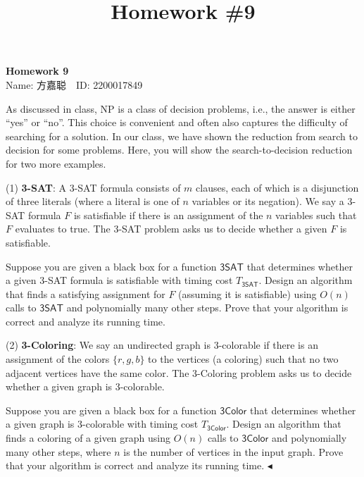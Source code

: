 \documentclass[11pt]{article}
\title{Homework \#9}
\newenvironment{problem}[2][Problem]{\begin{trivlist}
    \item[\hskip \labelsep{\bfseries#1}\hskip\labelsep{\bfseries#2.}]\mbox{}\newline}{\hfill$\blacktriangleleft$\end{trivlist}}
\begin{document}
\kaishu

\pagestyle{fancy}
\chead{}

\begin{center}
    {\LARGE \bf Homework 9}\\
    {Name: 方嘉聪\ \  ID: 2200017849}            %
\end{center}

\begin{problem}{1.(Search and Decision Problems)}
    As discussed in class, NP is a class of decision problems, i.e., the answer is either ``yes'' or ``no''. This choice is convenient and often also captures the difficulty of searching for a solution. In our class, we have shown the reduction from search to decision for some problems. Here, you will show the search-to-decision reduction for two more examples.

    (1) \textbf{3-SAT}: A 3-SAT formula consists of $m$ clauses, each of which is a disjunction of three literals (where a literal is one of $n$ variables or its negation). We say a 3-SAT formula $F$ is satisfiable if there is an assignment of the $n$ variables such that $F$ evaluates to true. The 3-SAT problem asks us to decide whether a given $F$ is satisfiable.
    
    Suppose you are given a black box for a function $\mathsf{3SAT}$ that determines whether a given 3-SAT formula is satisfiable with timing cost $T_{\mathsf{3SAT}}$. Design an algorithm that finds a satisfying assignment for $F$ (assuming it is satisfiable) using $O(n)$ calls to $\mathsf{3SAT}$ and polynomially many other steps. Prove that your algorithm is correct and analyze its running time.
    
    (2) \textbf{3-Coloring}: We say an undirected graph is 3-colorable if there is an assignment of the colors $\{r, g, b\}$ to the vertices (a coloring) such that no two adjacent vertices have the same color. The 3-Coloring problem asks us to decide whether a given graph is 3-colorable.
    
    Suppose you are given a black box for a function $\mathsf{3Color}$ that determines whether a given graph is 3-colorable with timing cost $T_{\mathsf{3Color}}$. Design an algorithm that finds a coloring of a given graph using $O(n)$ calls to $\mathsf{3Color}$ and polynomially many other steps, where $n$ is the number of vertices in the input graph. Prove that your algorithm is correct and analyze its running time.
\end{problem}
\end{document}
